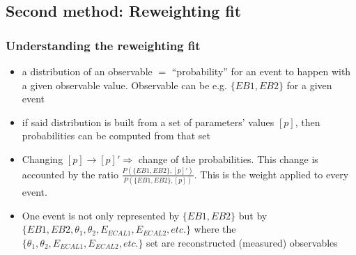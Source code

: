 \documentclass{beamer}
\begin{document}
\subsection{Second method: Reweighting fit}
\begin{frame}
\frametitle{Understanding the reweighting fit}
\begin{itemize}
  \item a \alert{distribution} of an observable $=$ \alert{``probability''} for
  an event to happen with a given observable value. Observable can be e.g.
  $\{EB1,EB2\}$ for a given event%
  \item if said distribution is built from a set of parameters' values
  $[p]$, then probabilities can be computed from that set
  \item Changing $[p]\to [p]'\Rightarrow$ change of the probabilities. This
  change is accounted by the ratio $\frac{P(\{EB1,EB2\},
  [p]')}{P(\{EB1,EB2\},[p])}$. This is the weight applied to every event.
  \item One event is not only represented by $\{EB1,EB2\}$ but by
  $\{EB1,EB2,\theta_1,\theta_2,E_{ECAL1},E_{ECAL2},etc.\}$ where the
  $\{\theta_1,\theta_2,E_{ECAL1},E_{ECAL2},etc.\}$ set are reconstructed
  (measured) observables
\end{itemize}
\end{frame}
\end{document}
